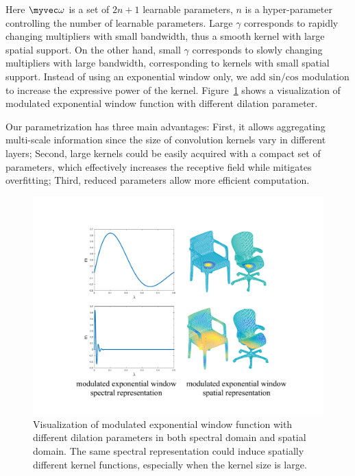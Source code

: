 Here $\myvec \omega$ is a set of $2n+1$ learnable parameters, $n$ is a hyper-parameter controlling the number of learnable parameters. Large $\gamma$ corresponds to rapidly changing multipliers with small bandwidth, thus a smooth kernel with large spatial support. On the other hand, small $\gamma$ corresponds to slowly changing multipliers with large bandwidth, corresponding to kernels with small spatial support. Instead of using an exponential window only, we add $\text{sin}/\text{cos}$ modulation to increase the expressive power of the kernel. Figure~\ref{fig:kernelvis} shows a visualization of modulated exponential window function with different dilation parameter.

Our parametrization has three main advantages: First, it allows aggregating multi-scale information since the size of convolution kernels vary in different layers; Second, large kernels could be easily acquired with a compact set of parameters, which effectively increases the receptive field while mitigates overfitting; Third, reduced parameters allow more efficient computation.

\vspace{-0.1cm}
\begin{figure}
    \centering
    \includegraphics[width=0.8\linewidth]{./fig/kernelvis4.pdf}
    \caption{Visualization of modulated exponential window function with different dilation parameters in both spectral domain and spatial domain. The same spectral representation could induce spatially different kernel functions, especially when the kernel size is large.}
    \label{fig:kernelvis}
    \vspace{-0.3cm}
\end{figure}

